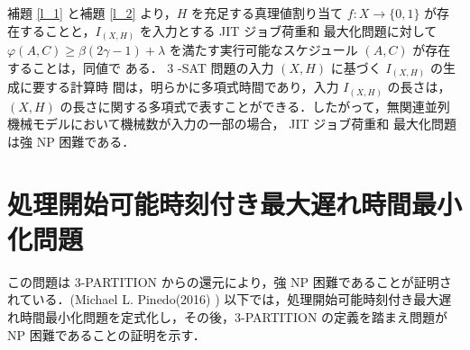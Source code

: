 \documentclass[12pt]{optlab-bachelor}
\begin{document}
補題 \ref{l_1} と補題 \ref{l_2} より，$H$ を充足する真理値割り当て $f : X \to \{0,
1\}$ が存在することと，$I_{(X,H)}$ を入力とする JIT ジョブ荷重和
最大化問題に対して $\varphi(A, C) \ge \beta(2\gamma − 1) + \lambda$
を満たす実行可能なスケジュール $(A, C)$ が存在することは，同値で
ある．
3 -SAT 問題の入力 $(X,H)$ に基づく $I_{(X,H)}$ の生成に要する計算時
間は，明らかに多項式時間であり，入力 $I_{(X,H)}$ の長さは，$(X, H)$
の長さに関する多項式で表すことができる．したがって，無関連並列
機械モデルにおいて機械数が入力の一部の場合， JIT ジョブ荷重和
最大化問題は強 NP 困難である．

\section{処理開始可能時刻付き最大遅れ時間最小化問題} %

この問題は 3-PARTITION からの還元により，強 NP 困難であることが証明さ
れている．(Michael L. Pinedo(2016) \cite{Lmax})
以下では，処理開始可能時刻付き最大遅れ時間最小化問題を定式化し，その後，3-PARTITION の定義を踏まえ問題が NP 困難であることの証明を示す．
\end{document}
